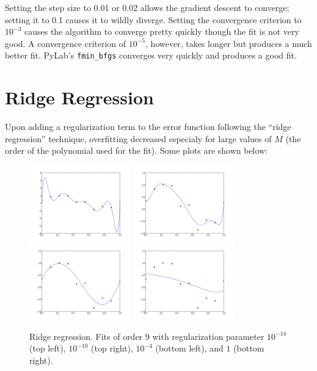 \documentclass{paper}
\begin{document}
Setting the step size to 0.01 or 0.02 allows the gradient descent to converge; setting it to 0.1 causes it to wildly diverge. Setting the convergence criterion to $10^{-3}$ causes the algorithm to converge pretty quickly though the fit is not very good. A convergence criterion of $10^{-5}$, however, takes longer but produces a much better fit. PyLab's \texttt{fmin\_bfgs} converges very quickly and produces a good fit.

\section{Ridge Regression}

Upon adding a regularization term to the error function following the ``ridge regression'' technique, overfitting decreased especialy for large values of $M$ (the order of the polynomial used for the fit). Some plots are shown below:

\begin{figure}[H]
	\includegraphics[width=165px]{plot6-underfit-l=0-00000000000001.png}
	\includegraphics[width=165px]{plot6-underfit-l=0-0000000001.png}
	\includegraphics[width=165px]{plot6-underfit-l=0-0001.png}
	\includegraphics[width=165px]{plot6-underfit-l=1.png}
	\caption{Ridge regression. Fits of order 9 with regularization parameter $10^{-14}$ (top left), $10^{-10}$ (top right), $10^{-4}$ (bottom left), and $1$ (bottom right).}
\end{figure}
\end{document}
